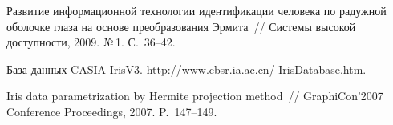 \begin{multicols}{2}
{{\begin{thebibliography}{9}
Развитие информационной технологии идентификации человека по радужной оболочке глаза на 
основе преобразования Эрмита~// Системы высокой доступности, 2009. №\,1. С.~36--42.

База данных CASIA-IrisV3. {\sf  http://www.cbsr.ia.ac.cn/ IrisDatabase.htm}.

\label{end\stat}

Iris data parametrization by Hermite projection method~// GraphiCon'2007 Conference Proceedings, 2007. P.~147--149. 
 \end{thebibliography}
}
}
\end{multicols}


        